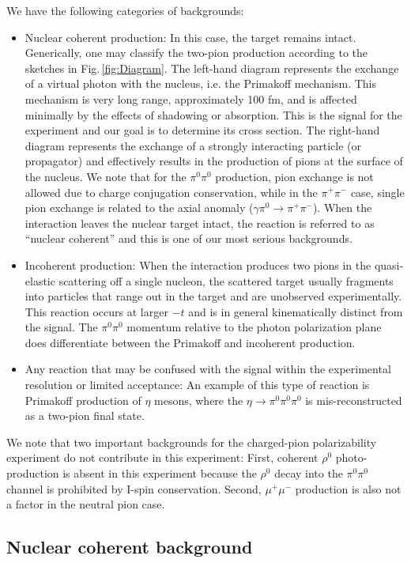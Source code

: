 We have the following categories of backgrounds:
\begin{itemize}
\item Nuclear coherent production: In this case, the target remains intact. Generically, one may classify the two-pion production
according to the sketches in Fig.\,\ref{fig:Diagram}. The left-hand diagram represents the exchange of a virtual photon with the nucleus, i.e. the Primakoff
mechanism. This mechanism is very long range, approximately 100 fm, and is affected minimally by the effects of shadowing or absorption.  This is the signal for the
experiment and our goal is to determine its cross section.
The right-hand diagram represents the exchange of a strongly interacting particle (or propagator) and effectively results in the production of pions at the
surface of the nucleus. We note that for the $\pi^0\pi^0$ production, pion exchange is not allowed due to charge conjugation conservation, while 
in the $\pi^+\pi^-$ case, single pion exchange is related to the axial anomaly ($\gamma \pi^0 \rightarrow \pi^+ \pi^-$).  When the interaction leaves the
nuclear target intact, the reaction is referred to as ``nuclear coherent'' and this is one of our most serious backgrounds. 
\item Incoherent production:  When the interaction produces two pions in the quasi-elastic scattering off a single
nucleon, the scattered target usually fragments into particles that range out in the target and are unobserved experimentally. This reaction occurs at larger $-t$ and is in general
kinematically distinct from the signal. The $\pi^0\pi^0$ momentum relative to the photon polarization plane does differentiate between the Primakoff and incoherent production.
\item Any reaction that may be confused with the signal within the experimental resolution or limited acceptance:
 An example of this type of reaction is Primakoff production of $\eta$ mesons, where the $\eta\rightarrow \pi^0 \pi^0 \pi^0$  is
mis-reconstructed as a two-pion final state. 
\end{itemize}

We note that two important backgrounds for the charged-pion polarizability experiment do not contribute in this experiment:
First, coherent $\rho^0$ photo-production is absent in this
experiment because the $\rho^0$ decay into the $\pi^0\pi^0$ channel is prohibited by I-spin conservation.  Second, $\mu^+\mu^-$ production is also not a factor in the neutral pion case.

\subsection{Nuclear coherent background \label{sec:NCback}}
   
